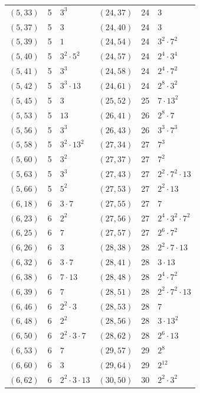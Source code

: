 \documentclass[11pt]{article}
\begin{document}
\begin{longtable}{@{}lrl@{\qquad}lrl@{}}
$(5,33)$ & 5 & $3^{3}$ & $(24,37)$ & 24 & $3$\\
$(5,37)$ & 5 & $3$ & $(24,40)$ & 24 & $3$\\
$(5,39)$ & 5 & $1$ & $(24,54)$ & 24 & $3^{2}\cdot 7^{2}$\\
$(5,40)$ & 5 & $3^{2}\cdot 5^{2}$ & $(24,57)$ & 24 & $2^{4}\cdot 3^{4}$\\
$(5,41)$ & 5 & $3^{3}$ & $(24,58)$ & 24 & $2^{4}\cdot 7^{2}$\\
$(5,42)$ & 5 & $3^{3}\cdot 13$ & $(24,61)$ & 24 & $2^{8}\cdot 3^{2}$\\
$(5,45)$ & 5 & $3$ & $(25,52)$ & 25 & $7\cdot 13^{2}$\\
$(5,53)$ & 5 & $13$ & $(26,41)$ & 26 & $2^{8}\cdot 7$\\
$(5,56)$ & 5 & $3^{3}$ & $(26,43)$ & 26 & $3^{3}\cdot 7^{3}$\\
$(5,58)$ & 5 & $3^{2}\cdot 13^{2}$ & $(27,34)$ & 27 & $7^{3}$\\
$(5,60)$ & 5 & $3^{2}$ & $(27,37)$ & 27 & $7^{2}$\\
$(5,63)$ & 5 & $3^{3}$ & $(27,43)$ & 27 & $2^{2}\cdot 7^{2}\cdot 13$\\
$(5,66)$ & 5 & $5^{2}$ & $(27,53)$ & 27 & $2^{2}\cdot 13$\\
$(6,18)$ & 6 & $3\cdot 7$ & $(27,55)$ & 27 & $7$\\
$(6,23)$ & 6 & $2^{2}$ & $(27,56)$ & 27 & $2^{4}\cdot 3^{2}\cdot 7^{2}$\\
$(6,25)$ & 6 & $7$ & $(27,57)$ & 27 & $2^{6}\cdot 7^{2}$\\
$(6,26)$ & 6 & $3$ & $(28,38)$ & 28 & $2^{2}\cdot 7\cdot 13$\\
$(6,32)$ & 6 & $3\cdot 7$ & $(28,41)$ & 28 & $3\cdot 13$\\
$(6,38)$ & 6 & $7\cdot 13$ & $(28,48)$ & 28 & $2^{4}\cdot 7^{2}$\\
$(6,39)$ & 6 & $7$ & $(28,51)$ & 28 & $2^{2}\cdot 7^{2}\cdot 13$\\
$(6,46)$ & 6 & $2^{2}\cdot 3$ & $(28,53)$ & 28 & $7$\\
$(6,48)$ & 6 & $2^{2}$ & $(28,56)$ & 28 & $3\cdot 13^{2}$\\
$(6,50)$ & 6 & $2^{2}\cdot 3\cdot 7$ & $(28,62)$ & 28 & $2^{6}\cdot 13$\\
$(6,53)$ & 6 & $7$ & $(29,57)$ & 29 & $2^{8}$\\
$(6,60)$ & 6 & $3$ & $(29,64)$ & 29 & $2^{12}$\\
$(6,62)$ & 6 & $2^{2}\cdot 3\cdot 13$ & $(30,50)$ & 30 & $2^{2}\cdot 3^{2}$\\

\end{longtable}
\end{document}

